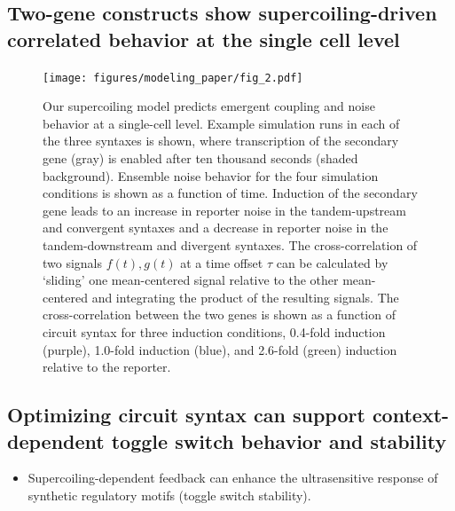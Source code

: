 \documentclass[11pt]{article}
\begin{document}
\subsection{Two-gene constructs show supercoiling-driven correlated behavior at the single cell level}
\begin{figure}[h]
    \centering
    {\texttt{[image: figures/modeling\_paper/fig\_2.pdf]}
    \label{fig:orientation_examples}
    \label{fig:noise_by_orientation}
    \label{fig:cross_correlation_cartoon}
    \label{fig:orientation_cross_correlation}}
    \caption{Our supercoiling model predicts emergent coupling and noise behavior at a single-cell level.
         Example simulation runs in each of the three syntaxes is shown, where transcription of the secondary gene (gray) is enabled after ten thousand seconds (shaded background).
         Ensemble noise behavior for the four simulation conditions is shown as a function of time. Induction of the secondary gene leads to an increase in reporter noise in the tandem-upstream and convergent syntaxes and a decrease in reporter noise in the tandem-downstream and divergent syntaxes.
         The cross-correlation of two signals \(f(t), g(t)\) at a time offset \(\tau\) can be calculated by `sliding' one mean-centered signal relative to the other mean-centered and integrating the product of the resulting signals.
         The cross-correlation between the two genes is shown as a function of circuit syntax for three induction conditions, 0.4-fold induction (purple), 1.0-fold induction (blue), and 2.6-fold (green) induction relative to the reporter.
    } \label{fig:top:single_cell_noise_correlation}
\end{figure}

\subsection{Optimizing circuit syntax can support context-dependent toggle switch behavior and stability}
\begin{itemize}
\item Supercoiling-dependent feedback can enhance the ultrasensitive response of synthetic regulatory motifs (toggle switch stability).
\end{itemize}
\end{document}
